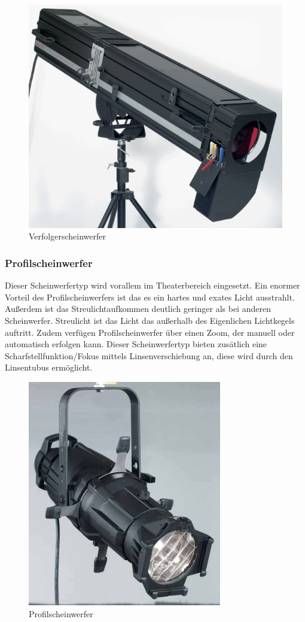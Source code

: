 \begin{figure}[H]
	\centering
	\includegraphics[width=0.7\linewidth]{images/Verfolgerscheinwerfer.jpg}
	\caption[Verfolgerscheinwerfer]{Verfolgerscheinwerfer}
	\label{fig:Verfolgerscheinwerfer}
\end{figure}

\subsubsection{Profilscheinwerfer}
Dieser Scheinwerfertyp wird vorallem im Theaterbereich eingesetzt. Ein enormer Vorteil des Profilscheinwerfers ist das es ein hartes und exates Licht ausstrahlt. Außerdem ist das Streulichtaufkommen deutlich geringer als bei anderen Scheinwerfer. Streulicht ist das Licht das außerhalb des Eigenlichen Lichtkegels auftritt. Zudem verfügen Profilscheinwerfer über einen Zoom, der manuell oder automatisch erfolgen kann. Dieser Scheinwerfertyp bieten zusätlich eine Scharfstellfunktion/Fokus mittels Linsenverschiebung an, diese wird durch den Linsentubus ermöglicht.\\
\cite{Profilscheinwerfer}

\begin{figure}[H]
	\centering
	\includegraphics[width=0.7\linewidth]{images/Profilscheinwerfer.jpg}
	\caption[Profilscheinwerfer]{Profilscheinwerfer}
	\label{fig:Profilscheinwerfer}
\end{figure}

